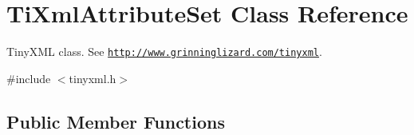 \hypertarget{class_ti_xml_attribute_set}{}\section{Ti\+Xml\+Attribute\+Set Class Reference}
\label{class_ti_xml_attribute_set}


Tiny\+X\+ML class. See \href{http://www.grinninglizard.com/tinyxml}{\tt http\+://www.\+grinninglizard.\+com/tinyxml}.  




{\ttfamily \#include $<$tinyxml.\+h$>$}

\subsection*{Public Member Functions}
